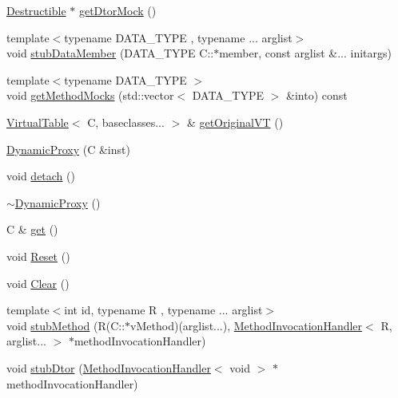 \begin{DoxyCompactItemize}
\item 
\mbox{\hyperlink{classfakeit_1_1Destructible}{Destructible}} $\ast$ \mbox{\hyperlink{structfakeit_1_1DynamicProxy_a32f8a09734ef6d70162d682fd593707b}{get\+Dtor\+Mock}} ()
\item 
{\footnotesize template$<$typename D\+A\+T\+A\+\_\+\+T\+Y\+PE , typename ... arglist$>$ }\\void \mbox{\hyperlink{structfakeit_1_1DynamicProxy_a872480e95dba48c6e690fb7cdc017f9d}{stub\+Data\+Member}} (D\+A\+T\+A\+\_\+\+T\+Y\+PE C\+::$\ast$member, const arglist \&... initargs)
\item 
{\footnotesize template$<$typename D\+A\+T\+A\+\_\+\+T\+Y\+PE $>$ }\\void \mbox{\hyperlink{structfakeit_1_1DynamicProxy_a21e8fdd6bcf64b2d7e0b86261529da35}{get\+Method\+Mocks}} (std\+::vector$<$ D\+A\+T\+A\+\_\+\+T\+Y\+PE $>$ \&into) const
\item 
\mbox{\hyperlink{structfakeit_1_1VirtualTable}{Virtual\+Table}}$<$ C, baseclasses... $>$ \& \mbox{\hyperlink{structfakeit_1_1DynamicProxy_aa34a496518156007196fd405dbf2e058}{get\+Original\+VT}} ()
\item 
\mbox{\hyperlink{structfakeit_1_1DynamicProxy_a417e0221b7df3845b201a9e4a1f5028b}{Dynamic\+Proxy}} (C \&inst)
\item 
void \mbox{\hyperlink{structfakeit_1_1DynamicProxy_a154f25eeeb36c0635d9209dd5870943e}{detach}} ()
\item 
\mbox{\hyperlink{structfakeit_1_1DynamicProxy_a05e9d9c1bcaf4bcd14d1b6311e16c809}{$\sim$\+Dynamic\+Proxy}} ()
\item 
C \& \mbox{\hyperlink{structfakeit_1_1DynamicProxy_af8e4100c2d995a26bf3209e68c11d12a}{get}} ()
\item 
void \mbox{\hyperlink{structfakeit_1_1DynamicProxy_a8f00dd7c68a247f715ec3925f662de9f}{Reset}} ()
\item 
void \mbox{\hyperlink{structfakeit_1_1DynamicProxy_a995c7e3dd97dc7707f18774eb4554b45}{Clear}} ()
\item 
{\footnotesize template$<$int id, typename R , typename ... arglist$>$ }\\void \mbox{\hyperlink{structfakeit_1_1DynamicProxy_ab1a98295698cf6eed3ff04ed4b838e51}{stub\+Method}} (R(C\+::$\ast$v\+Method)(arglist...), \mbox{\hyperlink{structfakeit_1_1MethodInvocationHandler}{Method\+Invocation\+Handler}}$<$ R, arglist... $>$ $\ast$method\+Invocation\+Handler)
\item 
void \mbox{\hyperlink{structfakeit_1_1DynamicProxy_a8ab5aa831398c6ee27cbdb12ee1f15cf}{stub\+Dtor}} (\mbox{\hyperlink{structfakeit_1_1MethodInvocationHandler}{Method\+Invocation\+Handler}}$<$ void $>$ $\ast$method\+Invocation\+Handler)

\end{DoxyCompactItemize}
